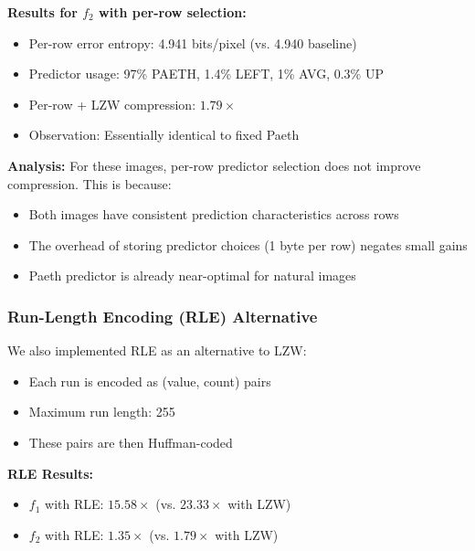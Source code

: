 \documentclass[11pt,a4paper]{article}
\begin{document}
\textbf{Results for $f_2$ with per-row selection:}
\begin{itemize}
    \item Per-row error entropy: 4.941 bits/pixel (vs. 4.940 baseline)
    \item Predictor usage: 97\% PAETH, 1.4\% LEFT, 1\% AVG, 0.3\% UP
    \item Per-row + LZW compression: $1.79\times$
    \item Observation: Essentially identical to fixed Paeth
\end{itemize}

\textbf{Analysis:} For these images, per-row predictor selection does not improve compression. This is because:
\begin{itemize}
    \item Both images have consistent prediction characteristics across rows
    \item The overhead of storing predictor choices (1 byte per row) negates small gains
    \item Paeth predictor is already near-optimal for natural images
\end{itemize}

\subsubsection{Run-Length Encoding (RLE) Alternative}
We also implemented RLE as an alternative to LZW:
\begin{itemize}
    \item Each run is encoded as (value, count) pairs
    \item Maximum run length: 255
    \item These pairs are then Huffman-coded
\end{itemize}

\textbf{RLE Results:}
\begin{itemize}
    \item $f_1$ with RLE: $15.58\times$ (vs. $23.33\times$ with LZW)
    \item $f_2$ with RLE: $1.35\times$ (vs. $1.79\times$ with LZW)
\end{itemize}
\end{document}
